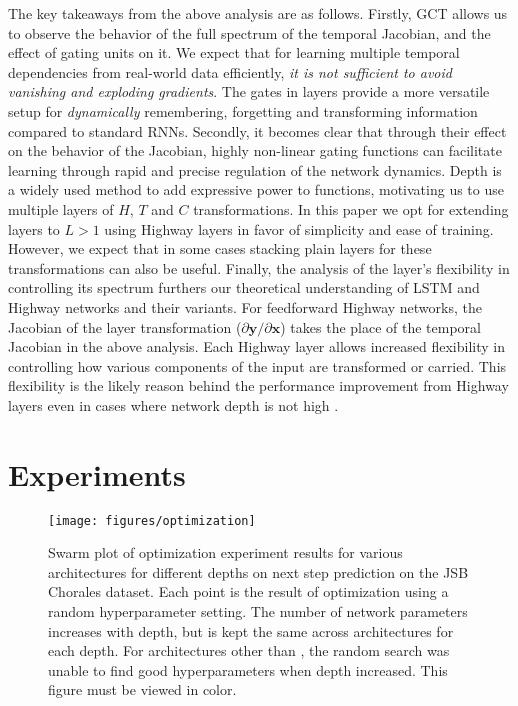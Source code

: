 \documentclass[letterpaper]{article}
\def\gct{GCT}
\def\xvec{\mathbf{x}}
\def\yvec{\mathbf{y}}
\def\srnn{standard RNN}
\begin{document}
The key takeaways from the above analysis are as follows. 
Firstly, \gct{} allows us to observe the behavior of the full spectrum of the temporal Jacobian, and the effect of gating units on it.
We expect that for learning multiple temporal dependencies from real-world data efficiently, \emph{it is not sufficient to avoid vanishing and exploding gradients}.
The gates in \arch{} layers provide a more versatile setup for \emph{dynamically} remembering, forgetting and transforming information compared to \srnn{}s.
Secondly, it becomes clear that through their effect on the behavior of the Jacobian, highly non-linear gating functions can facilitate learning through rapid and precise regulation of the network dynamics.
Depth is a widely used method to add expressive power to functions, motivating us to use multiple layers of $H$, $T$ and $C$ transformations.
In this paper we opt for extending \arch{} layers to $L>1$ using Highway layers in favor of simplicity and ease of training.
However, we expect that in some cases stacking plain layers for these transformations can also be useful.
Finally, the analysis of the \arch{} layer's flexibility in controlling its spectrum furthers our theoretical understanding of LSTM and Highway networks and their variants.
For feedforward Highway networks, the Jacobian of the layer transformation ($\partial\yvec/\partial\xvec$) takes the place of the temporal Jacobian in the above analysis.
Each Highway layer allows increased flexibility in controlling how various components of the input are transformed or carried.
This flexibility is the likely reason behind the performance improvement from Highway layers even in cases where network depth is not high \citep{kim2015}.

\section{Experiments}\label{sec:experiments}


\begin{figure*}[t]
\begin{center}
\texttt{[image: figures/optimization]}
\caption{Swarm plot of optimization experiment results for various architectures for different depths on next step prediction on the JSB Chorales dataset. Each point is the result of optimization using a random hyperparameter setting. The number of network parameters increases with depth, but is kept the same across architectures for each depth. For architectures other than \arch{}, the random search was unable to find good hyperparameters when depth increased. This figure must be viewed in color.}
\label{fig:optimization}
\end{center}
\end{figure*}
\end{document}

